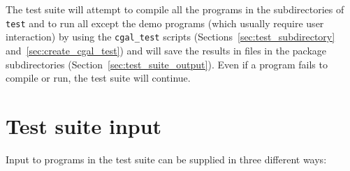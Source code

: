 The test suite will attempt to compile all the programs in the
subdirectories of {\tt test} and to run all except
the demo programs (which usually require user interaction) by using the 
{\tt cgal\_test} scripts 
(Sections~\ref{sec:test_subdirectory} and~\ref{sec:create_cgal_test})
and will save the results in files in the package subdirectories
(Section~\ref{sec:test_suite_output}). 
Even if a program fails to compile or run, the test suite will continue.


\section{Test suite input\label{sec:test_suite_input}}

Input to programs in the test suite can be supplied in three different
ways:
